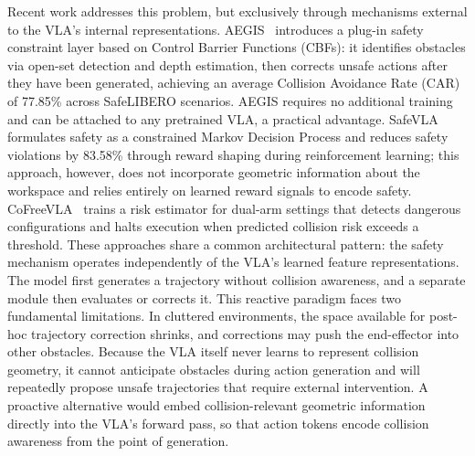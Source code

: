 Recent work addresses this problem, but exclusively through mechanisms external to the VLA's internal representations. AEGIS~\cite{hu2025vlsa} introduces a plug-in safety constraint layer based on Control Barrier Functions (CBFs): it identifies obstacles via open-set detection and depth estimation, then corrects unsafe actions after they have been generated, achieving an average Collision Avoidance Rate (CAR) of 77.85\% across SafeLIBERO scenarios. AEGIS requires no additional training and can be attached to any pretrained VLA, a practical advantage. SafeVLA~\cite{zhang2025safevla} formulates safety as a constrained Markov Decision Process and reduces safety violations by 83.58\% through reward shaping during reinforcement learning; this approach, however, does not incorporate geometric information about the workspace and relies entirely on learned reward signals to encode safety. CoFreeVLA~\cite{cofreeevla2026} trains a risk estimator for dual-arm settings that detects dangerous configurations and halts execution when predicted collision risk exceeds a threshold. These approaches share a common architectural pattern: the safety mechanism operates independently of the VLA's learned feature representations. The model first generates a trajectory without collision awareness, and a separate module then evaluates or corrects it. This reactive paradigm faces two fundamental limitations. In cluttered environments, the space available for post-hoc trajectory correction shrinks, and corrections may push the end-effector into other obstacles. Because the VLA itself never learns to represent collision geometry, it cannot anticipate obstacles during action generation and will repeatedly propose unsafe trajectories that require external intervention. A proactive alternative would embed collision-relevant geometric information directly into the VLA's forward pass, so that action tokens encode collision awareness from the point of generation.

